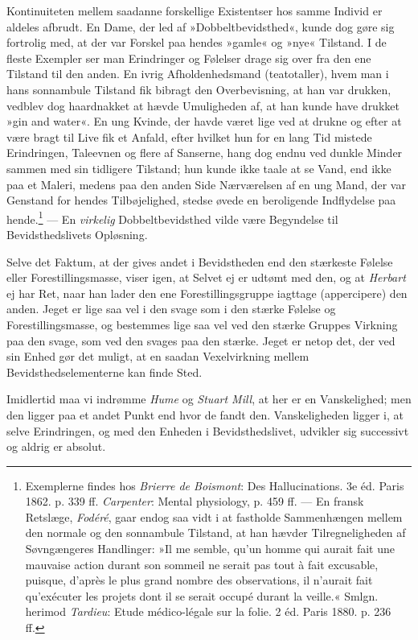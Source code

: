 \documentclass[12pt,a4paper,openany]{book}
\newcommand{\opage}[1]{\marginnote{\footnotesize\textit{[#1]}}}
\begin{document}
Kontinuiteten mellem saadanne forskellige Existentser hos samme Individ
er aldeles afbrudt. En Dame, der led af »Dobbeltbevidsthed«, kunde dog
gøre sig fortrolig med, at der var Forskel paa hendes »gamle« og »nye«
Tilstand. I de fleste Exempler ser man Erindringer og Følelser drage sig
over fra den ene Tilstand til den anden. En ivrig Afholdenhedsmand
(teatotaller), hvem man i hans sonnambule Tilstand fik bibragt den
Overbevisning, at han var drukken, vedblev dog haardnakket at hævde
Umuligheden af, at han kunde have drukket »gin and water«. En ung
Kvinde, der havde været lige ved at drukne og efter at være bragt til
Live fik et Anfald, efter hvilket hun for en lang Tid mistede
Erindringen, Taleevnen og flere af Sanserne, hang dog endnu ved dunkle
Minder sammen med sin tidligere Tilstand; hun kunde ikke taale at se
Vand, end ikke paa et Maleri, medens paa den anden Side Nærværelsen af
en ung Mand, der var Genstand for hendes Tilbøjelighed, stedse øvede
\opage{170}en beroligende Indflydelse paa hende.\footnote[1]{Exemplerne
findes hos \emph{Brierre de Boismont}: Des Hallucinations. 3e éd. Paris
1862. p. 339 ff. \emph{Carpenter}: Mental physiology, p. 459 ff. --- En
fransk Retslæge, \emph{Fodéré}, gaar endog saa vidt i at fastholde
Sammenhængen mellem den normale og den sonnambule Tilstand, at han
hævder Tilregneligheden af Søvngængeres Handlinger: »Il me semble, qu’un
homme qui aurait fait une mauvaise action durant son sommeil ne serait
pas tout à fait excusable, puisque, d’après le plus grand nombre des
observations, il n’aurait fait qu’exécuter les projets dont il se serait
occupé durant la veille.« Smlgn. herimod \emph{Tardieu}: Etude
médico-légale sur la folie. 2 éd. Paris 1880. p. 236 ff.} --- En
\emph{virkelig} Dobbeltbevidsthed vilde være Begyndelse til
Bevidsthedslivets Opløsning.

Selve det Faktum, at der gives andet i Bevidstheden end den stærkeste
Følelse eller Forestillingsmasse, viser igen, at Selvet ej er udtømt med
den, og at \emph{Herbart} ej har Ret, naar han lader den ene
Forestillingsgruppe iagttage (appercipere) den anden. Jeget er lige saa
vel i den svage som i den stærke Følelse og Forestillingsmasse, og
bestemmes lige saa vel ved den stærke Gruppes Virkning paa den svage,
som ved den svages paa den stærke. Jeget er netop det, der ved sin Enhed
gør det muligt, at en saadan Vexelvirkning mellem Bevidsthedselementerne
kan finde Sted.

Imidlertid maa vi indrømme \emph{Hume} og \emph{Stuart Mill}, at her er
en Vanskelighed; men den ligger paa et andet Punkt end hvor de fandt
den. Vanskeligheden ligger i, at selve Erindringen, og med den Enheden i
Bevidsthedslivet, udvikler sig successivt og aldrig er absolut.
\end{document}
